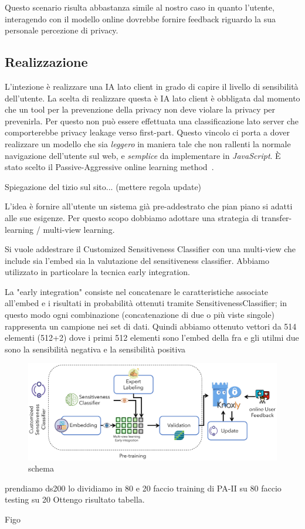 Questo scenario risulta abbastanza simile al nostro caso in quanto l'utente, interagendo con il modello online dovrebbe fornire feedback riguardo la sua personale percezione di privacy.

\subsection{Realizzazione}
L'intezione è realizzare una IA lato client in grado di capire il livello di sensibilità dell'utente. La scelta di realizzare questa è IA lato client è obbligata dal momento che un tool per la prevenzione della privacy non deve violare la privacy per prevenirla. Per questo non può essere effettuata una classificazione lato server che comporterebbe privacy leakage verso first-part. Questo vincolo ci porta a dover realizzare un modello che sia \textit{leggero} in maniera tale che non rallenti la normale navigazione dell'utente sul web, e \textit{semplice} da implementare in \textit{JavaScript}. È stato scelto il Passive-Aggressive online learning method~\cite{PAalgo}. 

Spiegazione del tizio sul sito... (mettere regola update)

L'idea è fornire all'utente un sistema già pre-addestrato che pian piano si adatti alle sue esigenze. Per questo scopo dobbiamo adottare una strategia di transfer-learning / multi-view learning\cite{transfer-learning}.

Si vuole addestrare il Customized Sensitiveness Classifier con una multi-view che include sia l'embed sia la valutazione del sensitiveness classifier. Abbiamo utilizzato in particolare la tecnica early integration. 

La "early integration" consiste nel concatenare le caratteristiche associate all'embed e i risultati in probabilità ottenuti tramite SensitivenessClassifier; in questo modo ogni combinazione (concatenazione di due o più viste singole) rappresenta un campione nei set di dati. Quindi abbiamo ottenuto vettori da 514 elementi (512+2) dove i primi 512 elementi sono l'embed della fra e gli utilmi due sono la sensibilità negativa e la sensibilità positiva

\begin{figure}[h]
    \centering
    \includegraphics[width=15cm]{Figure/grafici/customized_cropped.pdf}
    \caption{schema}
    \label{fig:approccisens}
\end{figure}
\FloatBarrier

prendiamo ds200
lo dividiamo in 80 e 20
faccio training di PA-II su 80
faccio testing su 20
Ottengo risultato tabella.

Figo
